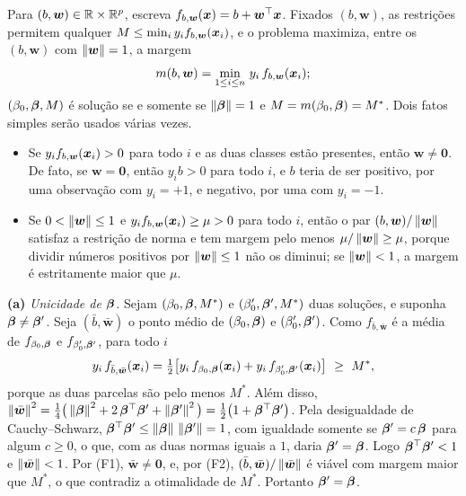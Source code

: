\begin{solucao}
Para $(b,\bm w)\in\mathbb{R}\times\mathbb{R}^p$, escreva $f_{b,\bm w}(\bm{x})=b+\bm w^\top\bm{x}$. Fixados $(b,\bm w)$,
as restrições permitem qualquer $M\le\min_iy_if_{b,\bm w}(\bm{x}_i)$, e o problema maximiza, entre
os $(b,\bm w)$ com $\left\lVert \bm w \right\rVert=1$, a margem
\[
  m(b,\bm w)=\min_{1\le i\le n}\,y_i\,f_{b,\bm w}(\bm{x}_i);
\]
$(\beta_0,\bm{\beta},M)$ é solução se e somente se $\left\lVert \bm{\beta} \right\rVert=1$ e
$M=m(\beta_0,\bm{\beta})=M^*$. Dois fatos simples serão usados várias vezes.
\begin{itemize}[leftmargin=1.2cm]
  \item[(F1)] Se $y_if_{b,\bm w}(\bm{x}_i)>0$ para todo $i$ e as duas classes estão presentes,
        então $\bm w\ne\bm0$. De fato, se $\bm w=\bm0$, então $y_ib>0$ para todo $i$, e $b$
        teria de ser positivo, por uma observação com $y_i=+1$, e negativo, por uma com
        $y_i=-1$.
  \item[(F2)] Se $0<\left\lVert \bm w \right\rVert\le1$ e $y_if_{b,\bm w}(\bm{x}_i)\ge\mu>0$ para todo $i$, então
        o par $(b,\bm w)/\left\lVert \bm w \right\rVert$ satisfaz a restrição de norma e tem margem pelo menos
        $\mu/\left\lVert \bm w \right\rVert\ge\mu$, porque dividir números positivos por $\left\lVert \bm w \right\rVert\le1$ não
        os diminui; se $\left\lVert \bm w \right\rVert<1$, a margem é estritamente maior que $\mu$.
\end{itemize}

\smallskip
\textbf{(a)} \emph{Unicidade de $\bm{\beta}$.} Sejam $(\beta_0,\bm{\beta},M^*)$ e $(\beta_0',\bm{\beta}',M^*)$
duas soluções, e suponha $\bm{\beta}\ne\bm{\beta}'$. Seja $(\bar b,\bar{\bm w})$ o ponto médio de
$(\beta_0,\bm{\beta})$ e $(\beta_0',\bm{\beta}')$. Como $f_{\bar b,\bar{\bm w}}$ é a média de
$f_{\beta_0,\bm{\beta}}$ e $f_{\beta_0',\bm{\beta}'}$, para todo $i$
\[
  y_i\,f_{\bar b,\bar{\bm w}}(\x_i)
  =\tfrac12\big[y_i\,f_{\beta_0,\bbeta}(\x_i)+y_i\,f_{\beta_0',\bbeta'}(\x_i)\big]\ \ge\ M^*,
\]
porque as duas parcelas são pelo menos $M^*$. Além disso,
$\left\lVert \bar{\bm w} \right\rVert^2=\tfrac14\big(\left\lVert \bm{\beta} \right\rVert^2+2\,\bm{\beta}^\top\bm{\beta}'+\left\lVert \bm{\beta}' \right\rVert^2\big)
=\tfrac12\big(1+\bm{\beta}^\top\bm{\beta}'\big)$. Pela desigualdade de Cauchy--Schwarz,
$\bm{\beta}^\top\bm{\beta}'\le\left\lVert \bm{\beta} \right\rVert\,\left\lVert \bm{\beta}' \right\rVert=1$, com igualdade somente se
$\bm{\beta}'=c\,\bm{\beta}$ para algum $c\ge0$, o que, com as duas normas iguais a $1$, daria
$\bm{\beta}'=\bm{\beta}$. Logo $\bm{\beta}^\top\bm{\beta}'<1$ e $\left\lVert \bar{\bm w} \right\rVert<1$. Por (F1),
$\bar{\bm w}\ne\bm0$, e, por (F2), $(\bar b,\bar{\bm w})/\left\lVert \bar{\bm w} \right\rVert$ é viável com margem
maior que $M^*$, o que contradiz a otimalidade de $M^*$. Portanto $\bm{\beta}'=\bm{\beta}$.


\end{solucao}
